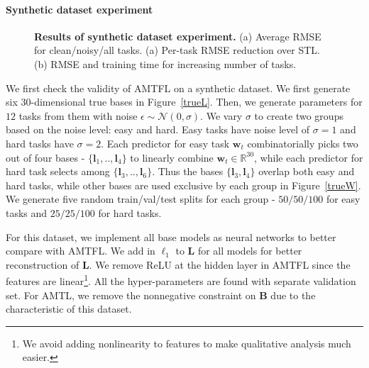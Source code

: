 \documentclass{article}
\newcommand{\vct}[1]{\boldsymbol{#1}} %
\newcommand{\mat}[1]{\boldsymbol{#1}} %
\begin{document}
	\paragraph{Synthetic dataset experiment}
	\begin{figure*}
		\begin{center}
			\hfill
			\hfill
			\hfill
			\hfill
			\vspace{-0.15in}
			\caption{\small \textbf{Results of synthetic dataset experiment.} (a) Average RMSE for clean/noisy/all tasks. 
				(a) Per-task RMSE reduction over STL. (b) RMSE and training time for increasing number of tasks.}
			\hfill
			\vspace{-0.25in}
		\end{center}
	\end{figure*}
	
	We first check the validity of AMTFL on a synthetic dataset. We first generate six $30$-dimensional true bases in Figure~\ref{trueL}. Then, we generate parameters for $12$ tasks from them with noise $\epsilon \sim \mathcal{N}(0, \sigma)$. We vary $\sigma$ to create two groups based on the noise level: easy and hard. Easy tasks have noise level of $\sigma=1$ and hard tasks have $\sigma=2$. Each predictor for easy task $\vct{w}_t$ combinatorially picks two out of four bases - $\{\vct{l}_1,..,\vct{l}_4\}$ to linearly combine $\vct{w}_t \in \mathbb{R}^{30}$, while each predictor for hard task selects among $\{\vct{l}_3,..,\vct{l}_6\}$. Thus the bases $\{\vct{l}_3,\vct{l}_4\}$ overlap both easy and hard tasks, while other bases are used exclusive by each group in Figure~\ref{trueW}. We generate five random train/val/test splits for each group - $50/50/100$ for easy tasks and $25/25/100$ for hard tasks.
	
	For this dataset, we implement all base models as neural networks to better compare with AMTFL. We add in $\ell_1$ to $\mat{L}$ for all models for better reconstruction of $\mat{L}$. We remove ReLU at the hidden layer in AMTFL since the features are linear\footnote{We avoid adding nonlinearity to features to make qualitative analysis much easier.}. All the hyper-parameters are found with separate validation set. For AMTL, we remove the nonnegative constraint on $\mat{B}$ due to the characteristic of this dataset.
	
\end{document}
